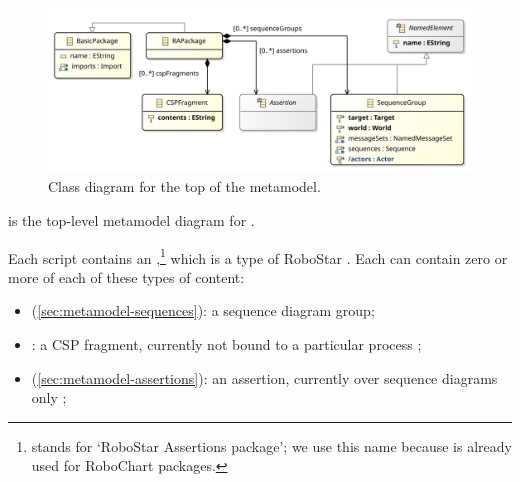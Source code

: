 \begin{figure}[htb]
  \centering
  \includegraphics[width=.85\textwidth]{diagrams/Top}
  \caption{Class diagram for the top of the \langname{} metamodel.}
  \label{fig:metamodel-top}
\end{figure}

 is the top-level metamodel diagram for \langname.

Each \langname{} script contains an \mrapackage,\footnote{\mrapackage{} stands
  for `RoboStar Assertions package'; we use this name because \mrcpackage{} is
  already used for RoboChart packages.}
which is a type of RoboStar \mbasicpackage.
Each \mrapackage{} can contain zero or more of each of these types of content:

\begin{itemize}
\item
  \msequencegroup{}
  (\cref{sec:metamodel-sequences}):
  a sequence diagram group;
\item
  \mcspfragment:
  a CSP fragment, currently not bound to a particular process
  ;
\item
  \massertion{}
  (\cref{sec:metamodel-assertions}):
  an assertion, currently over sequence diagrams only
  ;
\end{itemize}

